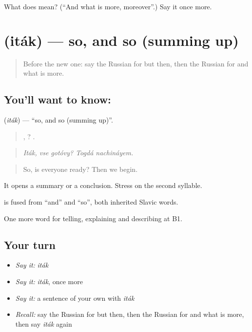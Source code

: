 \begin{tcolorbox}[breakable,colback=teal!4,colframe=teal!35!black,title={Before you move on}]
What does  mean? (\textquotedblleft{}And what is more, moreover\textquotedblright{}.) Say it once more.
\end{tcolorbox}
\section[\texorpdfstring{\ru{итак} (iták)}{итак (iták)}]{ (iták) — so, and so (summing up)}

\label{lesson:RU-C347-itak}



\begin{quote}
Before the new one: say the Russian for but then, then the Russian for and what is more.
\end{quote}

\subsection*{You'll want to know: }
\textbf{} (\emph{iták}) — \textquotedblleft{}so, and so (summing up)\textquotedblright{}.

\begin{quote}
,  ?  .
\end{quote}

\begin{quote}
\emph{Iták, vse gotóvy? Togdá nachináyem.}
\end{quote}

\begin{quote}
So, is everyone ready? Then we begin.
\end{quote}

It opens a summary or a conclusion. Stress on the second syllable.

\begin{cousinweb}
\textbf{} is fused from \emph{} \textquotedblleft{}and\textquotedblright{} and \emph{} \textquotedblleft{}so\textquotedblright{}, both inherited Slavic words.
\end{cousinweb}

\begin{grammarlens}[title={What you've built}]
One more word for telling, explaining and describing at B1.
\end{grammarlens}

\subsection*{Your turn}
\begin{itemize}
\raggedright
  \item \emph{Say it:} \emph{iták}
  \item \emph{Say it:} \emph{iták}, once more
  \item \emph{Say it:} a sentence of your own with \emph{iták}
  \item \emph{Recall:} say the Russian for but then, then the Russian for and what is more, then say \emph{iták} again
\end{itemize}

